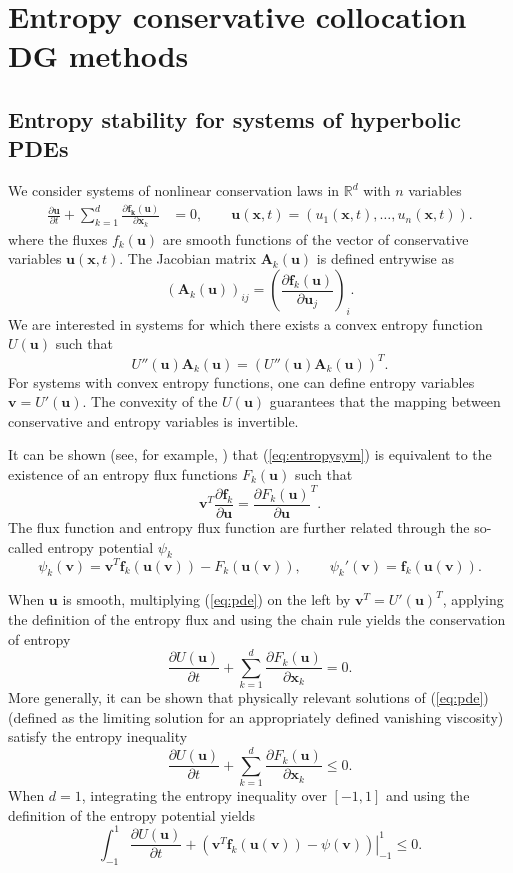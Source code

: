 \documentclass[preprint,10pt]{article}
\theoremstyle{definition}
\theoremstyle{lemma}
\theoremstyle{theorem}
\newcommand{\pd}[2]{\frac{\partial#1}{\partial#2}}
\newcommand{\LRp}[1]{\left( #1 \right)}
\begin{document}
\section{Entropy conservative collocation DG methods}

\subsection{Entropy stability for systems of hyperbolic PDEs}

We consider systems of nonlinear conservation laws in $\mathbb{R}^d$ with $n$ variables
\begin{align}
\pd{\bm{u}}{t} + \sum_{k=1}^d \pd{\bm{f_k(\bm{u})}}{\bm{x}_k} &= 0, \qquad \bm{u}(\bm{x},t) = (u_1(\bm{x},t),\ldots,u_n(\bm{x},t)).
\label{eq:pde}
\end{align}
where the fluxes $f_k(\bm{u})$ are smooth functions of the vector of conservative variables $\bm{u}(\bm{x},t)$.
The Jacobian matrix $\bm{A}_k(\bm{u})$ is defined entrywise as
\[
\LRp{\bm{A}_k(\bm{u})}_{ij} = \LRp{\pd{\bm{f}_k(\bm{u})}{\bm{u}_j}}_i.
\]
We are interested in systems for which there exists a convex entropy function $U(\bm{u})$ such that  
\begin{equation}
U''(\bm{u})\bm{A}_k(\bm{u}) = \LRp{U''(\bm{u}) \bm{A}_k(\bm{u})}^T.
\label{eq:entropysym}
\end{equation}
For systems with convex entropy functions, one can define entropy variables $\bm{v} = U'(\bm{u})$.  The convexity of the $U(\bm{u})$ guarantees that the mapping between conservative and entropy variables is invertible.  

It can be shown (see, for example, \cite{mock1980systems}) that (\ref{eq:entropysym}) is equivalent to the existence of an entropy flux functions $F_k(\bm{u})$ such that
\[
\bm{v}^T \pd{\bm{f}_k}{\bm{u}} = \pd{F_k(\bm{u})}{\bm{u}}^T.
\]
The flux function and entropy flux function are further related through the so-called entropy potential $\psi_k$ 
\[
\psi_k(\bm{v}) = \bm{v}^T\bm{f}_k(\bm{u}(\bm{v})) - F_k(\bm{u}(\bm{v})), \qquad \psi_k'(\bm{v}) = \bm{f}_k(\bm{u}(\bm{v})).
\]

When $\bm{u}$ is smooth, multiplying (\ref{eq:pde}) on the left by $\bm{v}^T = U'(\bm{u})^T$, applying the definition of the entropy flux and using the chain rule yields the conservation of entropy
\[
\pd{U(\bm{u})}{t} + \sum_{k=1}^d \pd{F_k(\bm{u})}{\bm{x}_k} = 0.
\]
More generally, it can be shown that physically relevant solutions of (\ref{eq:pde}) (defined as the limiting solution for an appropriately defined vanishing viscosity) satisfy the entropy inequality
\[
\pd{U(\bm{u})}{t} + \sum_{k=1}^d \pd{F_k(\bm{u})}{\bm{x}_k} \leq 0.  
\]
When $d = 1$, integrating the entropy inequality over $[-1,1]$ and using the definition of the entropy potential yields
\begin{equation}
\int_{-1}^1 \pd{U(\bm{u})}{t} + \left.\LRp{\bm{v}^T\bm{f}_k(\bm{u}(\bm{v}))-\psi(\bm{v})}\right|_{-1}^1 \leq 0.  
\label{eq:consentropy}
\end{equation}
\end{document}
